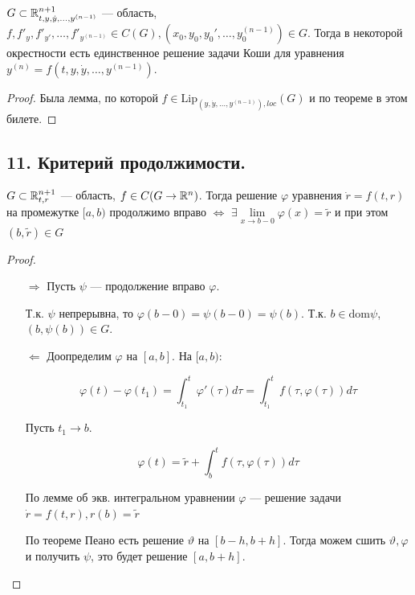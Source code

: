 \begin{corollary}
    \(G\subset \mathbb{R}^{n + 1}_{t, y, \dot{y}, \dots , y^{(n - 1)}}\) --- область, \(f, f'_y, f'_{y'}, \dots , f'_{y^{(n - 1)}}\in C(G), (x_0, y_0, y_0', \dots , y_0^{(n - 1)})\in G\). Тогда в некоторой окрестности есть единственное решение задачи Коши для уравнения \(y^{(n)} = f(t, y, \dot{y}, \dots , y^{(n - 1)})\).
\end{corollary}

\begin{proof}
    Была лемма, по которой \(f\in \text{Lip}_{(y, \dot{y}, \dots , y^{(n - 1)}), loc}(G)\) и по теореме в этом билете.
\end{proof}

\subsection*{11. Критерий продолжимости.}

\begin{theorem}
    \(G\subset \mathbb{R}^{n + 1}_{t, r}\) --- область, \(f\in C(G \to \mathbb{R}^n)\). Тогда решение \(\varphi\) уравнения \(\dot{r} = f(t, r)\) на промежутке \([a, b)\) продолжимо вправо \(\Leftrightarrow\) \(\exists \lim\limits_{x \to b - 0} \varphi(x) = \tilde{r}\) и при этом \((b, \tilde{r})\in G\)
\end{theorem}

\begin{proof}\itemfix
    \begin{itemize}
        \item [\( \Rightarrow \)] Пусть \(\psi\) --- продолжение вправо \(\varphi\).

              Т.к. \(\psi\) непрерывна, то \(\varphi(b - 0) = \psi(b - 0) = \psi(b)\). Т.к. \(b\in \text{dom}\psi\), \((b, \psi(b))\in G\).

        \item [\( \Leftarrow \)] Доопределим \(\varphi\) на \([a, b]\). На \([a, b)\):

              \[\varphi(t) - \varphi(t_1) = \int_{t_1}^t \varphi'(\tau)d\tau = \int_{t_1}^t f(\tau, \varphi(\tau))d\tau\]

              Пусть \(t_1 \to b\).

              \[\varphi(t) = \tilde{r} + \int_b^t f(\tau, \varphi(\tau))d\tau\]

              По лемме об экв. интегральном уравнении \(\varphi\) --- решение задачи \(\dot{r} = f(t, r), r(b) = \tilde{r}\)

              По теореме Пеано есть решение \(\vartheta\) на \([b - h, b + h]\). Тогда можем сшить \(\vartheta, \varphi\) и получить \(\psi\), это будет решение \([a, b + h]\).
    \end{itemize}
\end{proof}


